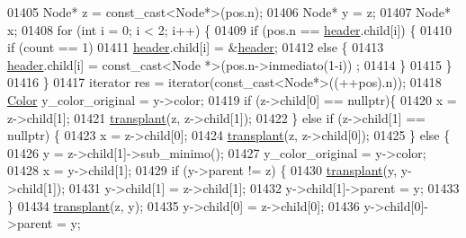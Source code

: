 \begin{DoxyCode}
01405         Node* z = \textcolor{keyword}{const\_cast<}Node*\textcolor{keyword}{>}(pos.n);
01406         Node* y = z;
01407         Node* x;
01408         \textcolor{keywordflow}{for} (\textcolor{keywordtype}{int} i = 0; i < 2; i++) \{
01409             \textcolor{keywordflow}{if} (pos.n == \hyperlink{classaed2_1_1map_a92d93f905c8ad73fba18fdc7e8915cce_a92d93f905c8ad73fba18fdc7e8915cce}{header}.child[i]) \{
01410                 \textcolor{keywordflow}{if} (count == 1)
01411                     \hyperlink{classaed2_1_1map_a92d93f905c8ad73fba18fdc7e8915cce_a92d93f905c8ad73fba18fdc7e8915cce}{header}.child[i] = &\hyperlink{classaed2_1_1map_a92d93f905c8ad73fba18fdc7e8915cce_a92d93f905c8ad73fba18fdc7e8915cce}{header};
01412                 \textcolor{keywordflow}{else} \{
01413                     \hyperlink{classaed2_1_1map_a92d93f905c8ad73fba18fdc7e8915cce_a92d93f905c8ad73fba18fdc7e8915cce}{header}.child[i] = \textcolor{keyword}{const\_cast<}Node *\textcolor{keyword}{>}(pos.n->inmediato(1-i))
      ;
01414                 \}
01415             \}
01416         \}
01417         iterator res = iterator(const\_cast<Node*>((++pos).n));
01418         \hyperlink{classaed2_1_1map_a6d62a415a4b9d320b30cada4ebcf9f5b_a6d62a415a4b9d320b30cada4ebcf9f5b}{Color} y\_color\_original = y->color;
01419         \textcolor{keywordflow}{if} (z->child[0] == \textcolor{keyword}{nullptr})\{
01420             x = z->child[1];
01421             \hyperlink{classaed2_1_1map_a98b9f200c64ce02dfb67902ee00e375a_a98b9f200c64ce02dfb67902ee00e375a}{transplant}(z, z->child[1]);
01422         \} \textcolor{keywordflow}{else} \textcolor{keywordflow}{if} (z->child[1] == \textcolor{keyword}{nullptr}) \{
01423             x = z->child[0];
01424             \hyperlink{classaed2_1_1map_a98b9f200c64ce02dfb67902ee00e375a_a98b9f200c64ce02dfb67902ee00e375a}{transplant}(z, z->child[0]);
01425         \} \textcolor{keywordflow}{else} \{
01426             y = z->child[1]->sub\_minimo();
01427             y\_color\_original = y->color;
01428             x = y->child[1];
01429             \textcolor{keywordflow}{if} (y->parent != z) \{
01430                 \hyperlink{classaed2_1_1map_a98b9f200c64ce02dfb67902ee00e375a_a98b9f200c64ce02dfb67902ee00e375a}{transplant}(y, y->child[1]);
01431                 y->child[1] = z->child[1];
01432                 y->child[1]->parent = y;
01433             \}
01434             \hyperlink{classaed2_1_1map_a98b9f200c64ce02dfb67902ee00e375a_a98b9f200c64ce02dfb67902ee00e375a}{transplant}(z, y);
01435             y->child[0] = z->child[0];
01436             y->child[0]->parent = y;

\end{DoxyCode}
